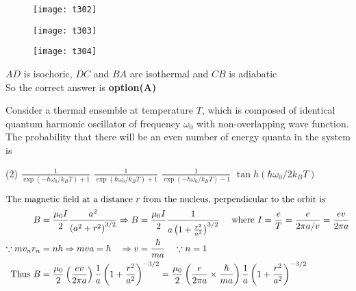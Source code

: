 \begin{questions}
\begin{tasks}
	\task[\textbf{B.}] \begin{figure}[H]
		\centering
		\texttt{[image: t302]}
	\end{figure}
	\task[\textbf{C.}] \begin{figure}[H]
		\centering
		\texttt{[image: t303]}
	\end{figure}
	\task[\textbf{D.}] \begin{figure}[H]
		\centering
		\texttt{[image: t304]}
	\end{figure}
\end{tasks}
\begin{answer}
	$A D$ is isochoric, $D C$ and $B A$ are isothermal and $C B$ is adiabatic\\
	So the correct answer is \textbf{option(A)}
\end{answer}
\begin{minipage}{\textwidth}
	\question Consider a thermal ensemble at temperature $T$, which is composed of identical quantum harmonic oscillator of frequency $\omega_{0}$ with non-overlapping wave function. The probability that there will be an even number of energy quanta in the system is 
\end{minipage}
\begin{tasks}(2)
	\task[\textbf{A.}] $\frac{1}{\exp \left(-\hbar \omega_{0} / k_{B} T\right)+1}$
	\task[\textbf{B.}]   $\frac{1}{\exp \left(\hbar \omega_{0} / k_{B} T\right)+1}$
	\task[\textbf{C.}] $\frac{1}{\exp \left(-\hbar \omega_{0} / k_{B} T\right)-1}$
	\task[\textbf{D.}] $\tan h\left(\hbar \omega_{0} / 2 k_{B} T\right)$
\end{tasks}
\begin{answer}
	\begin{align*}
	\intertext{The magnetic field at a distance $r$ from the nucleus, perpendicular to the orbit is}
	B&=\frac{\mu_{0} I}{2} \frac{a^{2}}{\left(a^{2}+r^{2}\right)^{3 / 2}} \Rightarrow B=\frac{\mu_{0} I}{2} \frac{1}{a\left(1+\frac{r^{2}}{a^{2}}\right)^{3 / 2}} \quad \text { where } I=\frac{e}{T}=\frac{e}{2 \pi a / v}=\frac{e v}{2 \pi a}\\
	\because m v_{n} r_{n}&=n \hbar \Rightarrow m v a=\hbar \quad \Rightarrow v=\frac{\hbar}{m a} \quad \because n=1\\
	\text { Thus } B&=\frac{\mu_{0}}{2}\left(\frac{e v}{2 \pi a}\right) \frac{1}{a}\left(1+\frac{r^{2}}{a^{2}}\right)^{-3 / 2}=\frac{\mu_{0}}{2}\left(\frac{e}{2 \pi a} \times \frac{\hbar}{m a}\right) \frac{1}{a}\left(1+\frac{r^{2}}{a^{2}}\right)^{-3 / 2}\\

\end{align*}
\end{answer}
\end{questions}
